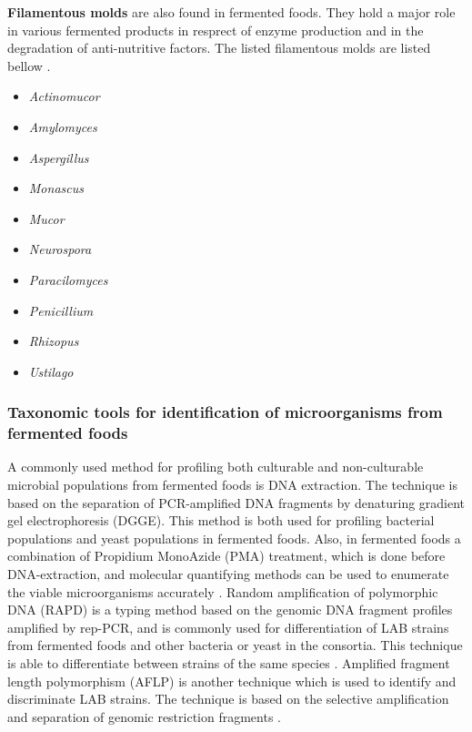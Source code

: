 \textbf{Filamentous molds} are also found in fermented foods. They hold a major role in various fermented products in resprect of enzyme production and in the degradation of anti-nutritive factors. The listed filamentous molds are listed bellow \cite*{L1-DiversityMicro}. 

\begin{highlight}
    \begin{multicols}{4}
        \begin{itemize}
            \item \textit{Actinomucor}
            \item \textit{Amylomyces}
            \item \textit{Aspergillus}
            \item \textit{Monascus}
            \item \textit{Mucor}
            \item \textit{Neurospora}
            \item \textit{Paracilomyces}
            \item \textit{Penicillium}
            \item \textit{Rhizopus}
            \item \textit{Ustilago}
        \end{itemize}
    \end{multicols}
\end{highlight}

\subsubsection*{Taxonomic tools for identification of microorganisms from fermented foods}

A commonly used method for profiling both culturable and non-culturable microbial populations from fermented foods is DNA extraction. The technique is based on the separation of PCR-amplified DNA fragments by denaturing gradient gel electrophoresis (DGGE). This method is both used for profiling bacterial populations and yeast populations in fermented foods. Also, in fermented foods a combination of Propidium MonoAzide (PMA) treatment, which is done before DNA-extraction, and molecular quantifying methods can be used to enumerate the viable microorganisms accurately \cite*{L1-DiversityMicro}.
Random amplification of polymorphic DNA (RAPD) is a typing method based on the genomic DNA fragment profiles amplified by rep-PCR, and is commonly used for differentiation of LAB strains from fermented foods and other bacteria or yeast in the consortia. This technique is able to differentiate between strains of the same species \cite*{L1-DiversityMicro}.
Amplified fragment length polymorphism (AFLP) is another technique which is used to identify and discriminate LAB strains. The technique is based on the selective amplification and separation of genomic restriction fragments \cite*{L1-DiversityMicro}.


